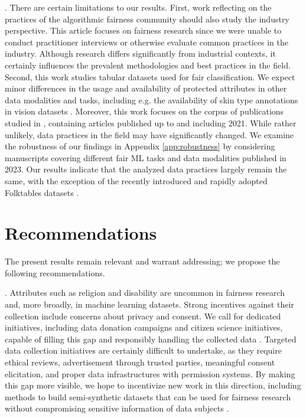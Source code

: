 . There are certain limitations to our results. First, work reflecting on the practices of the algorithmic fairness community should also study the industry perspective. This article focuses on fairness research since we were unable to conduct practitioner interviews or otherwise evaluate common practices in the industry. Although research differs significantly from industrial contexts, it certainly influences the prevalent methodologies and best practices in the field. Second, this work studies tabular datasets used for fair classification. We expect minor differences in the usage and availability of protected attributes in other data modalities and tasks, including e.g. the availability of skin type annotations in vision datasets \citep{buolamwini2018gender}.  Moreover, this work focuses on the corpus of publications studied in \citet{fabris2022algorithmic}, containing articles published up to and including 2021. While rather unlikely, data practices in the field may have significantly changed. We examine the robustness of our findings in Appendix \ref{app:robustness} by considering manuscripts covering different fair ML tasks and data modalities published in 2023. Our results indicate that the analyzed data practices largely remain the same, with the exception of the recently introduced and rapidly adopted Folktables datasets \citep{ding2021retiring}.

\section{Recommendations} \label{sec:recs}

The present results remain relevant and warrant addressing; we propose the following recommendations.

. Attributes such as religion and disability are uncommon in fairness research and, more broadly, in machine learning datasets. Strong incentives against their collection include concerns about privacy and consent. We call for dedicated initiatives, including data donation campaigns and citizen science initiatives, capable of filling this gap and responsibly handling the collected data \citep{bietz2019data}. Targeted data collection initiatives are certainly difficult to undertake, as they require ethical reviews, advertisement through trusted parties, meaningful consent elicitation, and proper data infrastructures with permission systems. By making this gap more visible, we hope to incentivize new work in this direction, including methods to build semi-synthetic datasets that can be used for fairness research without compromising sensitive information of data subjects \citep{stadler2022synthetic,bhanot2021problem}.

